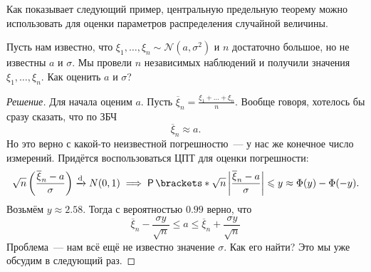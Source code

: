 Как показывает следующий пример, центральную предельную теорему можно использовать для оценки параметров распределения случайной величины.
\begin{example}
	Пусть нам известно, что \(\xi_{1}, \dots, \xi_{n} \sim \mathcal{N}(a, \sigma^2)\) и \(n\) достаточно большое, но не известны \(a\) и \(\sigma\). Мы провели \(n\) независимых наблюдений и получили значения \(\xi_{1}, \dots, \xi_{n}\). Как оценить \(a\) и \(\sigma\)?
\end{example}
\begin{proof}[Решение]
	Для начала оценим \(a\). Пусть \(\overline{\xi}_n = \frac{\xi_{1} + \dots + \xi_{n}}{n}\). Вообще говоря, хотелось бы сразу сказать, что по ЗБЧ
	\[
		\overline{\xi}_n \approx a.
	\]
	Но это верно с какой-то неизвестной погрешностю~--- у нас же конечное число измерений. Придётся воспользоваться ЦПТ для оценки погрешности:
	\[
		\sqrt{n}\left(\frac{\overline{\xi}_n - a}{\sigma}\right) \dto N(0, 1) \implies \Pr{\sqrt{n}\left|\frac{\overline{\xi}_n - a}{\sigma}\right| \leq y} \approx \Phi(y) - \Phi(-y).
	\]
	Возьмём \(y \approx 2.58\). Тогда с вероятностью \(0.99\) верно, что
	\[
		\overline{\xi}_n - \frac{\sigma y}{\sqrt{n}} \leq a \leq \overline{\xi}_n + \frac{\sigma y}{\sqrt{n}}
	\]
	Проблема~--- нам всё ещё не известно значение \(\sigma\). Как его найти? Это мы уже обсудим в следующий раз.
\end{proof}